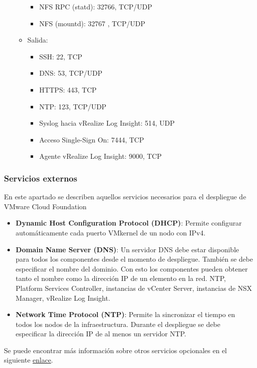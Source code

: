 \begin{itemize}
\begin{itemize}
\begin{itemize}
                \item NFS RPC (statd): 32766, TCP/UDP
                \item NFS (mountd): 32767 , TCP/UDP
            \end{itemize}
        \item Salida:
            \begin{itemize}
                \item SSH: 22, TCP
                \item DNS: 53, TCP/UDP
                \item HTTPS: 443, TCP
                \item NTP: 123, TCP/UDP
                \item Syslog hacia vRealize Log Insight: 514, UDP
                \item Acceso Single-Sign On: 7444, TCP
                \item Agente vRealize Log Insight: 9000, TCP
            \end{itemize}
    \end{itemize}
\end{itemize}
\fi

\FloatBarrier

\subsubsection{Servicios externos}
\label{subsubsec:servExterno}
En este apartado se describen aquellos servicios necesarios para el despliegue de VMware Cloud Foundation
\begin{itemize}
    \item \textbf{Dynamic Host Configuration Protocol (DHCP)}: Permite configurar automáticamente cada puerto VMkernel de un nodo con IPv4. 
    \item \textbf{Domain Name Server (DNS)}: Un servidor DNS debe estar disponible para todos los componentes desde el momento de despliegue. También se debe especificar el nombre del dominio. Con esto los componentes pueden obtener tanto el nombre como la dirección IP de un elemento en la red. NTP, Platform Services Controller, instancias de vCenter Server, instancias de NSX Manager, vRealize Log Insight.
    \item \textbf{Network Time Protocol (NTP)}: Permite la sincronizar el tiempo en todos los nodos de la infraestructura. Durante el despliegue se debe especificar la dirección IP de al menos un servidor NTP.
\end{itemize}
Se puede encontrar más información sobre otros servicios opcionales en el siguiente \href{https://docs.vmware.com/en/VMware-Cloud-Foundation/3.9/com.vmware.vcf.planprep.doc_39/GUID-F022BD3C-F11C-4EE6-83EA-ABE016E7A9B9.htm}{enlace}.
\FloatBarrier

